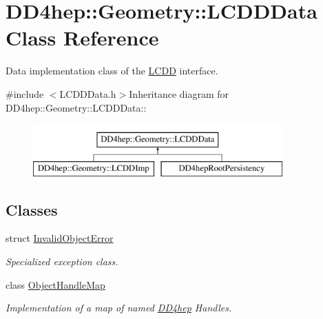 \hypertarget{class_d_d4hep_1_1_geometry_1_1_l_c_d_d_data}{
\section{DD4hep::Geometry::LCDDData Class Reference}
\label{class_d_d4hep_1_1_geometry_1_1_l_c_d_d_data}
}


Data implementation class of the \hyperlink{class_d_d4hep_1_1_geometry_1_1_l_c_d_d}{LCDD} interface.  


{\ttfamily \#include $<$LCDDData.h$>$}Inheritance diagram for DD4hep::Geometry::LCDDData::\begin{figure}[H]
\begin{center}
\leavevmode
\includegraphics[height=2cm]{class_d_d4hep_1_1_geometry_1_1_l_c_d_d_data}
\end{center}
\end{figure}
\subsection*{Classes}
\begin{DoxyCompactItemize}
\item 
struct \hyperlink{struct_d_d4hep_1_1_geometry_1_1_l_c_d_d_data_1_1_invalid_object_error}{InvalidObjectError}
\begin{DoxyCompactList}\small\item\em Specialized exception class. \item\end{DoxyCompactList}\item 
class \hyperlink{class_d_d4hep_1_1_geometry_1_1_l_c_d_d_data_1_1_object_handle_map}{ObjectHandleMap}
\begin{DoxyCompactList}\small\item\em Implementation of a map of named \hyperlink{namespace_d_d4hep}{DD4hep} Handles. \item\end{DoxyCompactList}\end{DoxyCompactItemize}
